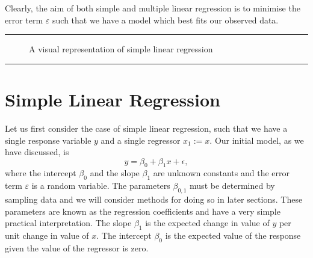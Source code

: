 \documentclass[10pt,a4paper, twocolumn, conference]{IEEEtran}
\begin{document}
Clearly, the aim of both simple and multiple linear regression is to minimise the error term $\varepsilon$ such that we have a model which best fits our observed data.
\vspace{2mm}
\hrule
\begin{figure}[H]
\centering
{}
\caption{A visual representation of simple linear regression}
\label{fig:figure2}
\end{figure}
\hrule
\vspace{2mm}
\section{Simple Linear Regression}
Let us first consider the case of simple linear regression, such that we have a single response variable $y$ and a single regressor $x_1 := x$. Our initial model, as we have discussed, is
\begin{equation}
y = \beta_0 + \beta_1 x + \epsilon,
\end{equation}
where the intercept $\beta_0$ and the slope $\beta_1$ are unknown constants and the error term $\varepsilon$ is a random variable. The parameters $\beta_{0,1}$ must be determined by sampling data and we will consider methods for doing so in later sections. These parameters are known as the regression coefficients and have a very simple practical interpretation. The slope $\beta_1$ is the expected change in value of $y$ per unit change in value of $x$. The intercept $\beta_0$ is the expected value of the response given the value of the regressor is zero.
\end{document}
